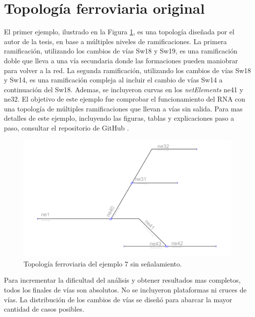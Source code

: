 \section{Topología ferroviaria original}

	El primer ejemplo, ilustrado en la Figura \ref{fig:EJ7_1}, es una topología diseñada por el autor de la tesis, en base a múltiples niveles de ramificaciones. La primera ramificación, utilizando los cambios de vías Sw18 y Sw19, es una ramificación doble que lleva a una vía secundaria donde las formaciones pueden maniobrar para volver a la red. La segunda ramificación, utilizando los cambios de vías Sw18 y Sw14, es una ramificación compleja al incluir el cambio de vías Sw14 a continuación del Sw18. Ademas, se incluyeron curvas en los \textit{netElements} ne41 y ne32. El objetivo de este ejemplo fue comprobar el funcionamiento del RNA con una topología de múltiples ramificaciones que llevan a vías sin salida.	Para mas detalles de este ejemplo, incluyendo las figuras, tablas y explicaciones paso a paso, consultar el repositorio de GitHub \cite{GITHUB_PHD}.
	
	\begin{figure}[h]
		\centering
		\includegraphics[width=1\textwidth]{resultados-obtenidos/ejemplo7/images/7_empty.png}
		\centering\caption{Topología ferroviaria del ejemplo 7 sin señalamiento.}
		\label{fig:EJ7_1}
	\end{figure}
	
	Para incrementar la dificultad del análisis y obtener resultados mas completos, todos los finales de vías son absolutos. No se incluyeron plataformas ni cruces de vías. La distribución de los cambios de vías se diseñó para abarcar la mayor cantidad de casos posibles.